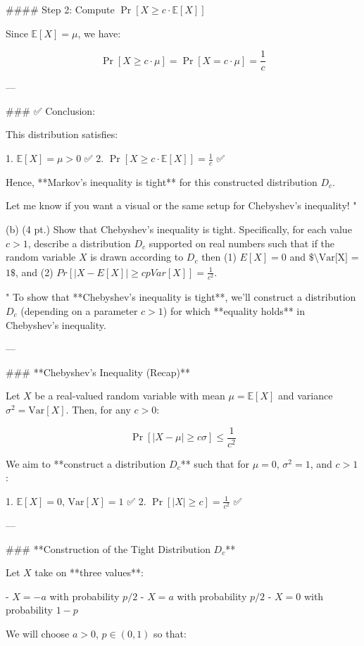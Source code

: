 #### Step 2: Compute \( \Pr[X \ge c \cdot \mathbb{E}[X]] \)

Since \( \mathbb{E}[X] = \mu \), we have:

\[
\Pr[X \ge c \cdot \mu] = \Pr[X = c \cdot \mu] = \frac{1}{c}
\]

---

### ✅ Conclusion:

This distribution satisfies:

1. \( \mathbb{E}[X] = \mu > 0 \) ✅  
2. \( \Pr[X \ge c \cdot \mathbb{E}[X]] = \frac{1}{c} \) ✅

Hence, **Markov's inequality is tight** for this constructed distribution \( D_c \).

Let me know if you want a visual or the same setup for Chebyshev's inequality!
"

(b) (4 pt.) Show that Chebyshev's inequality is tight. Specifically, for each value $c > 1$, describe a distribution $D_c$ supported on real numbers such that if the random variable $X$ is drawn according to $D_c$ then
(1) $E[X] = 0$ and $\Var[X] = 1$, and
(2) $Pr[|X - E[X]| ≥ cpVar[X]] = \frac{1}{c^2}$.

"
To show that **Chebyshev's inequality is tight**, we'll construct a distribution \( D_c \) (depending on a parameter \( c > 1 \)) for which **equality holds** in Chebyshev's inequality.

---

### **Chebyshev's Inequality (Recap)**

Let \( X \) be a real-valued random variable with mean \( \mu = \mathbb{E}[X] \) and variance \( \sigma^2 = \text{Var}[X] \). Then, for any \( c > 0 \):

\[
\Pr[|X - \mu| \ge c\sigma] \le \frac{1}{c^2}
\]

We aim to **construct a distribution \( D_c \)** such that for \( \mu = 0 \), \( \sigma^2 = 1 \), and \( c > 1 \):

1. \( \mathbb{E}[X] = 0 \), \( \text{Var}[X] = 1 \) ✅  
2. \( \Pr[|X| \ge c] = \frac{1}{c^2} \) ✅

---

### **Construction of the Tight Distribution \( D_c \)**

Let \( X \) take on **three values**:

- \( X = -a \) with probability \( p/2 \)  
- \( X = a \) with probability \( p/2 \)  
- \( X = 0 \) with probability \( 1 - p \)

We will choose \( a > 0 \), \( p \in (0,1) \) so that:

